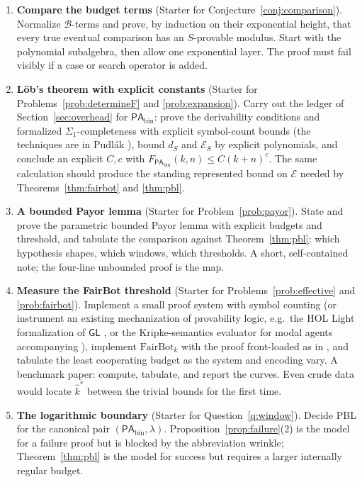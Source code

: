 \documentclass[11pt]{amsart}
\theoremstyle{plain}
\theoremstyle{definition}
\newcommand{\PAbin}{\mathsf{PA}_{\mathrm{bin}}}
\newcommand{\GL}{\mathsf{GL}}
\newcommand{\FB}{\mathrm{FairBot}}
\newcommand{\Bud}{\mathcal{B}}
\begin{document}
\begin{enumerate}
\item \textbf{Compare the budget terms} (Starter for Conjecture~\ref{conj:comparison}).
Normalize $\Bud$-terms and prove, by induction on their exponential height, that every true eventual comparison has an $S$-provable modulus. Start with the polynomial subalgebra, then allow one exponential layer. The proof must fail visibly if a case or search operator is added.

\item \textbf{L\"ob's theorem with explicit constants} (Starter for Problems~\ref{prob:determineF} and \ref{prob:expansion}).\label{start:constants}
Carry out the ledger of Section~\ref{sec:overhead} for $\PAbin$: prove the derivability conditions and formalized $\Sigma_1$-completeness with explicit symbol-count bounds (the techniques are in Pudl\'ak \cite{pudlak1986, pudlak1998}), bound $d_S$ and $\mathcal{E}_S$ by explicit polynomials, and conclude an explicit $C,c$ with $F_{\PAbin}(k,n)\le C(k+n)^c$. The same calculation should produce the standing represented bound on $\mathcal E$ needed by Theorems~\ref{thm:fairbot} and \ref{thm:pbl}.

\item \textbf{A bounded Payor lemma} (Starter for Problem~\ref{prob:payor}).
State and prove the parametric bounded Payor lemma with explicit budgets and threshold, and tabulate the comparison against Theorem~\ref{thm:pbl}: which hypothesis shapes, which windows, which thresholds. A short, self-contained note; the four-line unbounded proof is the map.

\item \textbf{Measure the FairBot threshold} (Starter for Problems~\ref{prob:effective} and \ref{prob:fairbot}).\label{start:machine}
Implement a small proof system with symbol counting (or instrument an existing mechanization of provability logic, e.g.\ the HOL Light formalization of $\GL$ \cite{maggesi2023}, or the Kripke-semantics evaluator for modal agents accompanying \cite{barasz2014}), implement $\FB_k$ with the proof front-loaded as in \cite{cdr2022}, and tabulate the least cooperating budget as the system and encoding vary. A benchmark paper: compute, tabulate, and report the curves. Even crude data would locate $\hat{k}^{*}$ between the trivial bounds for the first time.

\item \textbf{The logarithmic boundary} (Starter for Question~\ref{q:window}).
Decide PBL for the canonical pair $(\PAbin,\lambda)$. Proposition~\ref{prop:failure}(2) is the model for a failure proof but is blocked by the abbreviation wrinkle; Theorem~\ref{thm:pbl} is the model for success but requires a larger internally regular budget.
\end{enumerate}
\end{document}
